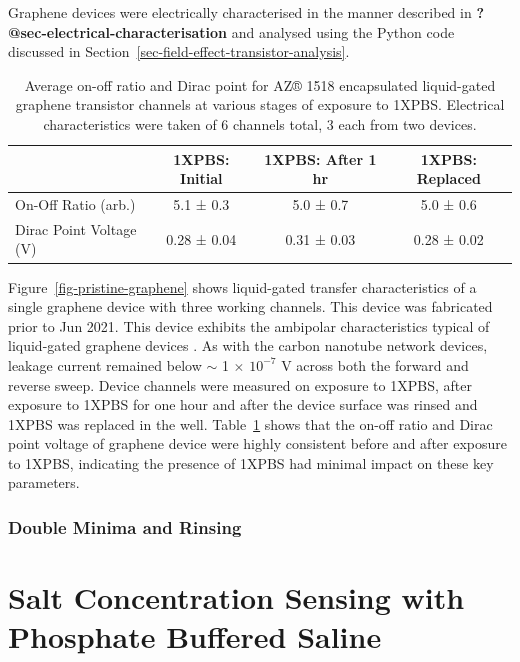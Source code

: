 \documentclass[
  a4paper,
]{scrbook}
\begin{document}
Graphene devices were electrically characterised in the manner described
in \textbf{?@sec-electrical-characterisation} and analysed using the
Python code discussed in
Section~\ref{sec-field-effect-transistor-analysis}.

\hypertarget{tbl-graphene-parameters}{}
\begin{table}
\caption{\label{tbl-graphene-parameters}Average on-off ratio and Dirac point for AZ® 1518 encapsulated
liquid-gated graphene transistor channels at various stages of exposure
to 1XPBS. Electrical characteristics were taken of 6 channels total, 3
each from two devices. }\tabularnewline

\centering
\begin{tabular}{lccc}
\toprule
 & 1XPBS: Initial & 1XPBS: After 1 hr  & 1XPBS: Replaced\\
\midrule
On-Off Ratio (arb.) & 5.1 ± 0.3 & 5.0 ± 0.7 & 5.0 ± 0.6\\
Dirac Point Voltage (V) & 0.28 ± 0.04 & 0.31 ± 0.03 & 0.28 ± 0.02\\
\bottomrule
\end{tabular}
\end{table}

Figure~\ref{fig-pristine-graphene} shows liquid-gated transfer
characteristics of a single graphene device with three working channels.
This device was fabricated prior to Jun 2021. This device exhibits the
ambipolar characteristics typical of liquid-gated graphene devices
\autocite{Heller2009a,Heller2010,Xia2010,Kireev2017}. As with the carbon
nanotube network devices, leakage current remained below \(\sim\) 1
\(\times\) \(10^{-7}\) V across both the forward and reverse sweep.
Device channels were measured on exposure to 1XPBS, after exposure to
1XPBS for one hour and after the device surface was rinsed and 1XPBS was
replaced in the well. Table~\ref{tbl-graphene-parameters} shows that the
on-off ratio and Dirac point voltage of graphene device were highly
consistent before and after exposure to 1XPBS, indicating the presence
of 1XPBS had minimal impact on these key parameters.

\hypertarget{double-minima-and-rinsing}{%
\subsubsection*{Double Minima and
Rinsing}\label{double-minima-and-rinsing}}

\hypertarget{sec-dummy-sensing}{%
\section{Salt Concentration Sensing with Phosphate Buffered
Saline}\label{sec-dummy-sensing}}
\end{document}
